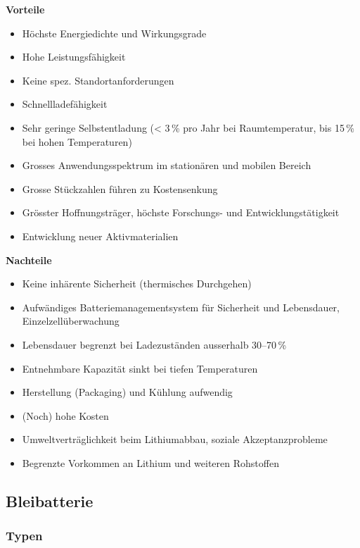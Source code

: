 \begin{minipage}{0.48\textwidth}
\textbf{Vorteile}
\begin{itemize}
  \item Höchste Energiedichte und Wirkungsgrade
  \item Hohe Leistungsfähigkeit
  \item Keine spez. Standortanforderungen
  \item Schnellladefähigkeit
  \item Sehr geringe Selbstentladung (< 3\,\% pro Jahr bei Raumtemperatur, bis 15\,\% bei hohen Temperaturen)
  \item Grosses Anwendungsspektrum im stationären und mobilen Bereich
  \item Grosse Stückzahlen führen zu Kostensenkung
  \item Grösster Hoffnungsträger, höchste Forschungs- und Entwicklungstätigkeit
  \item Entwicklung neuer Aktivmaterialien
\end{itemize}
\end{minipage}
\hfill
\begin{minipage}{0.48\textwidth}
\textbf{Nachteile}
\begin{itemize}
  \item Keine inhärente Sicherheit (thermisches Durchgehen)
  \item Aufwändiges Batteriemanagementsystem für Sicherheit und Lebensdauer, Einzelzellüberwachung
  \item Lebensdauer begrenzt bei Ladezuständen ausserhalb 30--70\,\%
  \item Entnehmbare Kapazität sinkt bei tiefen Temperaturen
  \item Herstellung (Packaging) und Kühlung aufwendig
  \item (Noch) hohe Kosten
  \item Umweltverträglichkeit beim Lithiumabbau, soziale Akzeptanzprobleme
  \item Begrenzte Vorkommen an Lithium und weiteren Rohstoffen
\end{itemize}
\end{minipage}


\columnbreak
\subsection{Bleibatterie}
\subsubsection{Typen}

